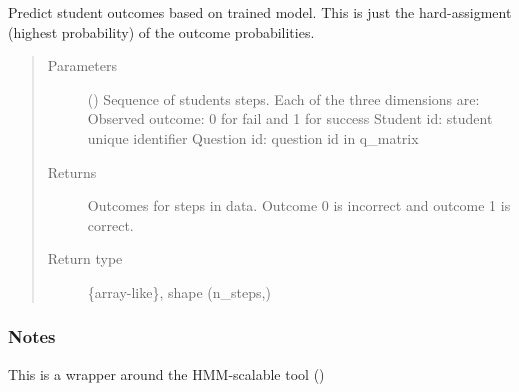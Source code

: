 \documentclass[letterpaper,10pt,english]{sphinxmanual}
\begin{document}
\begin{fulllineitems}
\begin{fulllineitems}
\label{\detokenize{bkt:bkt.BKT.predict}}
Predict student outcomes based on trained model. This is just the hard-assigment
(highest probability) of the outcome probabilities.
\begin{quote}\begin{description}
\item[{Parameters}] \leavevmode
{} (\sphinxstyleliteralemphasis{\sphinxupquote{, }}\sphinxstyleliteralemphasis{\sphinxupquote{ (}}\sphinxstyleliteralemphasis{\sphinxupquote{, }}\sphinxstyleliteralemphasis{\sphinxupquote{)}}) \textendash{} Sequence of students steps. Each of the three dimensions are:
Observed outcome: 0 for fail and 1 for success
Student id: student unique identifier
Question id: question id in q\_matrix

\item[{Returns}] \leavevmode
{} \textendash{} Outcomes for steps in data. Outcome 0 is incorrect and outcome 1 is correct.

\item[{Return type}] \leavevmode
\{array-like\}, shape (n\_steps,)

\end{description}\end{quote}
\subsubsection*{Notes}

This is a wrapper around the HMM-scalable tool ()

\end{fulllineitems}



\end{fulllineitems}
\end{document}
